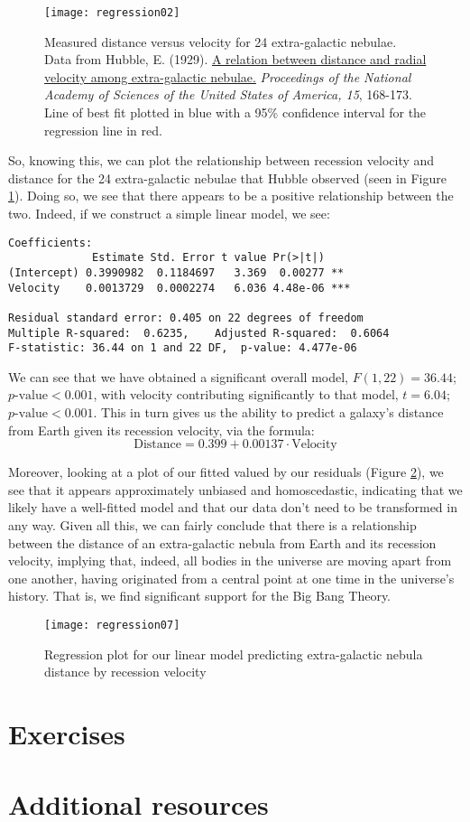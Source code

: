 \begin{figure}[h]
\texttt{[image: regression02]}
\label{fig:regression02}
\caption{Measured distance versus velocity for 24 extra-galactic nebulae. Data from Hubble, E. (1929). \href{http://www.ncbi.nlm.nih.gov/pmc/articles/PMC522427/}{A relation between distance and radial velocity among extra-galactic nebulae.} \textit{Proceedings of the National Academy of Sciences of the United States of America, 15}, 168-173. Line of best fit plotted in blue with a 95\% confidence interval for the regression line in red.}
\end{figure}

So, knowing this, we can plot the relationship between recession velocity and distance for the 24 extra-galactic nebulae that Hubble observed (seen in Figure \ref{fig:regression02}). Doing so, we see that there appears to be a positive relationship between the two. Indeed, if we construct a simple linear model, we see:

\begin{framed}
\begin{Verbatim}[samepage=TRUE]
Coefficients:
             Estimate Std. Error t value Pr(>|t|)    
(Intercept) 0.3990982  0.1184697   3.369  0.00277 ** 
Velocity    0.0013729  0.0002274   6.036 4.48e-06 ***

Residual standard error: 0.405 on 22 degrees of freedom
Multiple R-squared:  0.6235,	Adjusted R-squared:  0.6064 
F-statistic: 36.44 on 1 and 22 DF,  p-value: 4.477e-06
\end{Verbatim}
\end{framed}

We can see that we have obtained a significant overall model, $F(1,22) = 36.44$; $p\text{-value}<0.001$, with velocity contributing significantly to that model, $t=6.04$; $p\text{-value}<0.001$. This in turn gives us the ability to predict a galaxy's distance from Earth given its recession velocity, via the formula:
\begin{equation*}
\text{Distance}=0.399+0.00137\cdot\text{Velocity}
\end{equation*}

Moreover, looking at a plot of our fitted valued by our residuals (Figure \ref{fig:regression07}), we see that it appears approximately unbiased and homoscedastic, indicating that we likely have a well-fitted model and that our data don't need to be transformed in any way. Given all this, we can fairly conclude that there is a relationship between the distance of an extra-galactic nebula from Earth and its recession velocity, implying that, indeed, all bodies in the universe are moving apart from one another, having originated from a central point at one time in the universe's history. That is, we find significant support for the Big Bang Theory.

\begin{figure}[h]
\texttt{[image: regression07]}
\label{fig:regression07}
\caption{Regression plot for our linear model predicting extra-galactic nebula distance by recession velocity}
\end{figure}
\section{Exercises}

\section{Additional resources}